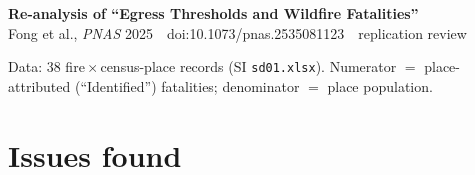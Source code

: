 \documentclass[9pt]{extarticle}
\begin{document}
\pagestyle{empty}

\begin{center}
{\Large\bfseries Re-analysis of ``Egress Thresholds and Wildfire Fatalities''}\\[2pt]
{\normalsize Fong et al., \emph{PNAS} 2025 \,\textbar\, doi:10.1073/pnas.2535081123 \,\textbar\, replication review}
\end{center}
\vspace{-4pt}
{\footnotesize Data: 38 fire\,$\times$\,census-place records (SI \texttt{sd01.xlsx}). Numerator $=$ place-attributed (``Identified'') fatalities; denominator $=$ place population.}

\section*{Issues found}
\end{document}
